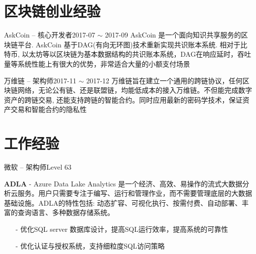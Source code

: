 \documentclass[10pt,a4paper]{moderncv}
\begin{document}
\section{区块链创业经验}
\vspace*{0.2\baselineskip}
	{ AskCoin -- 核心开发者}{2017-07 $\sim$ 2017-09}{}{}
	{AskCoin 是一个面向知识共享服务的区块链平台. AskCoin 基于DAG(有向无环图)技术重新实现共识账本系统. 相对于比特币, 以太坊等以区块链为基本数据结构的共识账本系统，DAG在响应延时，吞吐量等系统性能上有很大的优势，非常适合大量的小额支付场景}
\vspace{1ex}

	{万维链 -- 架构师}{2017-11 $\sim$ 2017-12}{}{}
	{万维链旨在建立一个通用的跨链协议，任何区块链网络，无论公有链、还是联盟链，均能低成本的接入万维链。不但能完成数字资产的跨链交易, 还能支持跨链的智能合约。同时应用最新的密码学技术，保证资产交易和智能合约的隐私性}
\vspace{1ex}

\vspace*{0.4\baselineskip}

\section{工作经验}
\vspace{2ex}

	{微软 -- 架构师}{Level 63}{}{}{}

\vspace{1ex}
{
    \textbf{ADLA} - Azure Data Lake Analytics 是一个经济、高效、易操作的流式大数据分析云服务。用户只需要专注于编写、运行和管理作业，而不需要管理底层的大数据基础设施。ADLA的特性包括: 动态扩容、可视化执行、按需付费、自动部署、丰富的查询语言、多种数据存储系统。
    \begin{itemize}
		\item[-] 优化SQL server 数据库设计，提高SQL运行效率，提高系统的可靠性
		\item[-] 优化认证与授权系统，支持细粒度SQL访问策略
	\end{itemize}
}
\vspace{2ex}
\end{document}

